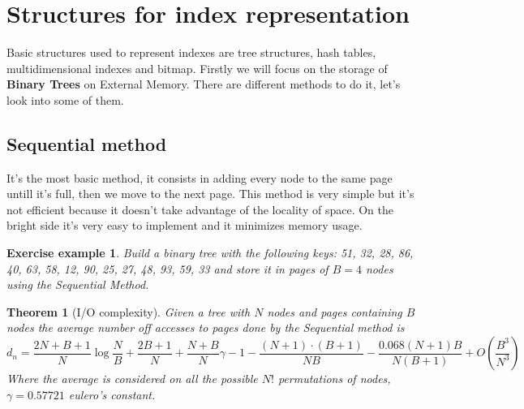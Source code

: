 \documentclass{report}
\newtheorem{teo}{Theorem}[chapter]
\newtheorem{es}{Exercise example}[chapter]
\begin{document}
\section{Structures for index representation}
Basic structures used to represent indexes are tree structures, hash tables, multidimensional indexes and bitmap. Firstly we will focus on the storage of \textbf{Binary Trees} on External Memory. There are different methods to do it, let's look into some of them.
\subsection{Sequential method}
It's the most basic method, it consists in adding every node to the same page untill it's full, then we move to the next page. This method is very simple but it's not efficient because it doesn't take advantage of the locality of space. On the bright side it's very easy to implement and it minimizes memory usage.
\begin{es}\label{es1}
    Build a binary tree with the following keys: 51, 32, 28, 86, 40, 63, 58, 12, 90, 25, 27, 48, 93, 59, 33 and store it in pages of \(B=4\) nodes using the Sequential Method. 
\end{es}
\begin{teo}[I/O complexity]
    Given a tree with \(N\) nodes and pages containing \(B\) nodes the average number off accesses to pages done by the Sequential method is
    \begin{equation}
        d_n =
        \frac{2N + B + 1}{N} \log \frac{N}{B}
        + \frac{2B + 1}{N}
        + \frac{N + B}{N} \gamma - 1
        - \frac{(N + 1) \cdot (B + 1)}{NB} 
        - \frac{0.068(N + 1)B}{N(B + 1)} + O\left(\frac{B^3}{N^3}\right)        
    \end{equation}
    Where the average is considered on all the possible \(N!\) permutations of nodes, \(\gamma = 0.57721\) eulero's constant.
\end{teo}
\end{document}
